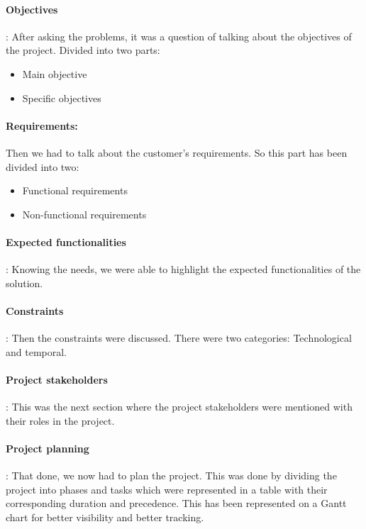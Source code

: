 \paragraph{Objectives}: After asking the problems, it was a question of talking about the objectives of the project. Divided into two parts:
\begin{itemize}
    \item Main objective
    \item Specific objectives
\end{itemize}

\paragraph{Requirements:} Then we had to talk about the customer's requirements. So this part has been divided into two:
\begin{itemize}
    \item Functional requirements
    \item Non-functional requirements
\end{itemize}

\paragraph{Expected functionalities}: Knowing the needs, we were able to highlight the expected functionalities of the solution.

\paragraph{Constraints}: Then the constraints were discussed. There were two categories: Technological and temporal.

\paragraph{Project stakeholders}: This was the next section where the project stakeholders were mentioned with their roles in the project.

\paragraph{Project planning}: That done, we now had to plan the project. This was done by dividing the project into phases and tasks which were represented in a table with their corresponding duration and precedence. This has been represented on a Gantt chart for better visibility and better tracking.

